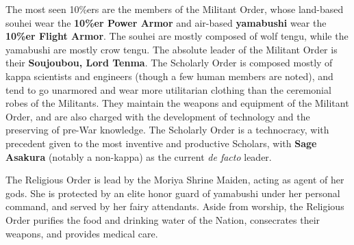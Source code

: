 \documentclass[a4paper,12pt]{book}
\begin{document}
The most seen 10\%ers are the members of the Militant Order, whose land-based souhei wear the \textbf{10\%er Power Armor} and air-based \textbf{yamabushi} wear the \textbf{10\%er Flight Armor}. The souhei are mostly composed of wolf tengu, while the yamabushi are mostly crow tengu. The absolute leader of the Militant Order is their \textbf{Soujoubou, Lord Tenma}. The Scholarly Order is composed mostly of kappa scientists and engineers (though a few human members are noted), and tend to go unarmored and wear more utilitarian clothing than the ceremonial robes of the Militants. They maintain the weapons and equipment of the Militant Order, and are also charged with the development of technology and the preserving of pre-War knowledge. The Scholarly Order is a technocracy, with precedent given to the most inventive and productive Scholars, with \textbf{Sage Asakura} (notably a non-kappa) as the current \emph{de facto} leader.

The Religious Order is lead by the Moriya Shrine Maiden, acting as agent of her gods. She is protected by an elite honor guard of yamabushi under her personal command, and served by her fairy attendants. Aside from worship, the Religious Order purifies the food and drinking water of the Nation, consecrates their weapons, and provides medical care.
\end{document}
